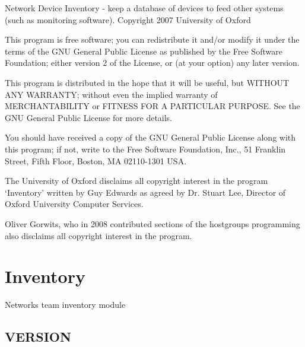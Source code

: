 \documentclass{book}
\begin{document}
Network Device Inventory - keep a database of devices to feed other systems (such as monitoring software). Copyright 2007 University of Oxford



This program is free software; you can redistribute it and/or modify it under the terms of the GNU General Public License as published by the Free Software Foundation; either version 2 of the License, or (at your option) any later version.



This program is distributed in the hope that it will be useful, but WITHOUT ANY WARRANTY; without even the implied warranty of MERCHANTABILITY or FITNESS FOR A PARTICULAR PURPOSE. See the GNU General Public License for more details.



You should have received a copy of the GNU General Public License along with this program; if not, write to the Free Software Foundation, Inc., 51 Franklin Street, Fifth Floor, Boston, MA 02110-1301 USA.



The University of Oxford disclaims all copyright interest in the program `Inventory' written by Guy Edwards as agreed by Dr. Stuart Lee, Director of Oxford University Computer Services.



Oliver Gorwits, who in 2008 contributed sections of the hostgroups programming also disclaims all copyright interest in the program.




\section{Inventory}
\label{_Inventory::Interfaces}
\hypertarget{_Inventory::Interfaces}{}



Networks team inventory module


\subsection{VERSION}
\label{Inventory::Interfaces_VERSION}
\hypertarget{Inventory::Interfaces_VERSION}{}
\end{document}
